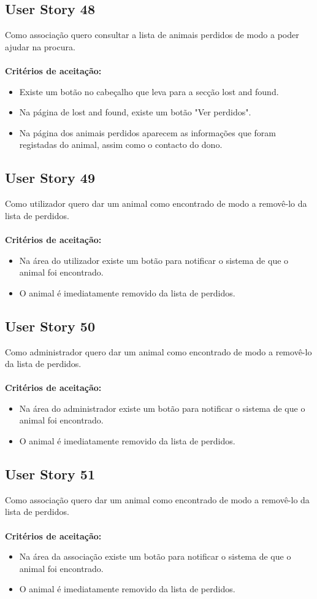 \documentclass[a4paper,11pt]{article}
\begin{document}
\subsection*{User Story 48}
Como associação quero consultar a lista de animais perdidos de modo a poder ajudar na procura.\\\\
\textbf{Critérios de aceitação:}
\begin{itemize}
  \item Existe um botão no cabeçalho que leva para a secção lost and found.
  \item Na página de lost and found, existe um botão "Ver perdidos".
  \item Na página dos animais perdidos aparecem as informações que foram registadas do animal, assim como o contacto do dono.
\end{itemize}

\subsection*{User Story 49}
Como utilizador quero dar um animal como encontrado de modo a removê-lo da lista de perdidos.\\\\
\textbf{Critérios de aceitação:}
\begin{itemize}
  \item Na área do utilizador existe um botão para notificar o sistema de que o animal foi encontrado.
  \item O animal é imediatamente removido da lista de perdidos.
\end{itemize}

\subsection*{User Story 50}
Como administrador quero dar um animal como encontrado de modo a removê-lo da lista de perdidos.\\\\
\textbf{Critérios de aceitação:}
\begin{itemize}
  \item Na área do administrador existe um botão para notificar o sistema de que o animal foi encontrado.
  \item O animal é imediatamente removido da lista de perdidos.
\end{itemize}

\subsection*{User Story 51}
Como associação quero dar um animal como encontrado de modo a removê-lo da lista de perdidos.\\\\
\textbf{Critérios de aceitação:}
\begin{itemize}
  \item Na área da associação existe um botão para notificar o sistema de que o animal foi encontrado.
  \item O animal é imediatamente removido da lista de perdidos.
\end{itemize}
\end{document}

